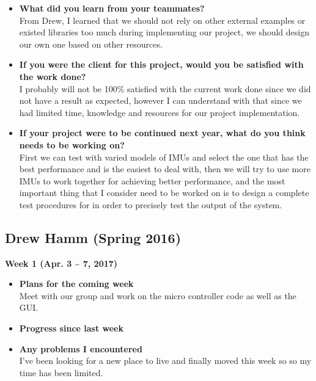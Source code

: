 \begin{itemize}
		\item \textbf{What did you learn from your teammates?}
		\\From Drew, I learned that we should not rely on other external examples or existed libraries too much during implementing our project, we should design our own one based on other resources.\\

		\item \textbf{If you were the client for this project, would you be satisfied with the work done?}
		\\ I probably will not be 100\% satisfied with the current work done since we did not have a result as expected, however I can understand with that since we had limited time, knowledge and resources for our project implementation.\\

		\item \textbf{If your project were to be continued next year, what do you think needs to be working on?}
		\\First we can test with varied models of IMUs and select the one that has the best performance and is the easiest to deal with, then we will try to use more IMUs to work together for achieving better performance, and the most important thing that I consider need to be worked on is to design a complete test procedures for in order to precisely test the output of the system.\\
	\end{itemize}


\newpage
	\subsection{Drew Hamm (Spring 2016)}
	\vspace{0.5cm}

	\begin{center}
		\textbf{Week 1 (Apr. 3 {\textasciitilde{}} 7, 2017)}
	\end{center}
	\begin{itemize}
		\item \textbf{Plans for the coming week}
		\\Meet with our group and work on the micro controller code as well as the GUI.\\

		\item \textbf{Progress since last week}

		\item \textbf{Any problems I encountered}
		\\ I've been looking for a new place to live and finally moved this week so so my time has been limited.\\
	\end{itemize}

